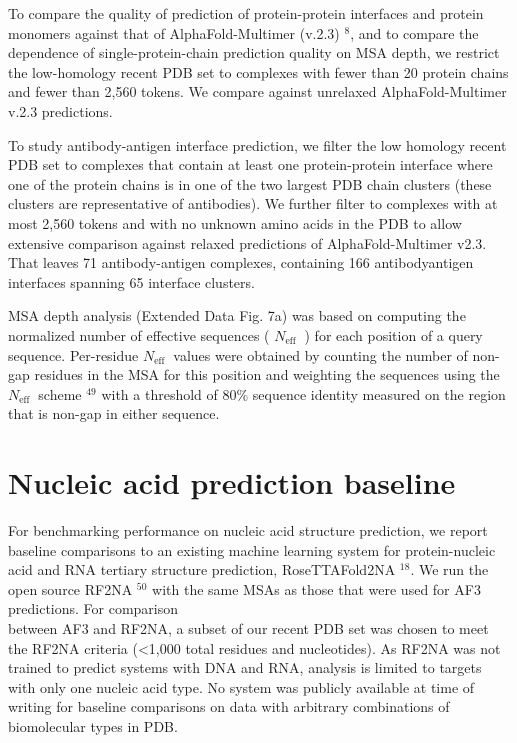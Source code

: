 \documentclass[10pt]{article}
\begin{document}
To compare the quality of prediction of protein-protein interfaces and protein monomers against that of AlphaFold-Multimer (v.2.3) ${ }^{8}$, and to compare the dependence of single-protein-chain prediction quality on MSA depth, we restrict the low-homology recent PDB set to complexes with fewer than 20 protein chains and fewer than 2,560 tokens. We compare against unrelaxed AlphaFold-Multimer v.2.3 predictions.

To study antibody-antigen interface prediction, we filter the low homology recent PDB set to complexes that contain at least one protein-protein interface where one of the protein chains is in one of the two largest PDB chain clusters (these clusters are representative of antibodies). We further filter to complexes with at most 2,560 tokens and with no unknown amino acids in the PDB to allow extensive comparison against relaxed predictions of AlphaFold-Multimer v2.3. That leaves 71 antibody-antigen complexes, containing 166 antibodyantigen interfaces spanning 65 interface clusters.

MSA depth analysis (Extended Data Fig. 7a) was based on computing the normalized number of effective sequences ( $N_{\text {eff }}$ ) for each position of a query sequence. Per-residue $N_{\text {eff }}$ values were obtained by counting the number of non-gap residues in the MSA for this position and weighting the sequences using the $N_{\text {eff }}$ scheme ${ }^{49}$ with a threshold of $80 \%$ sequence identity measured on the region that is non-gap in either sequence.

\section*{Nucleic acid prediction baseline}
For benchmarking performance on nucleic acid structure prediction, we report baseline comparisons to an existing machine learning system for protein-nucleic acid and RNA tertiary structure prediction, RoseTTAFold2NA ${ }^{18}$. We run the open source RF2NA ${ }^{50}$ with the same MSAs as those that were used for AF3 predictions. For comparison\\
between AF3 and RF2NA, a subset of our recent PDB set was chosen to meet the RF2NA criteria (<1,000 total residues and nucleotides). As RF2NA was not trained to predict systems with DNA and RNA, analysis is limited to targets with only one nucleic acid type. No system was publicly available at time of writing for baseline comparisons on data with arbitrary combinations of biomolecular types in PDB.
\end{document}
